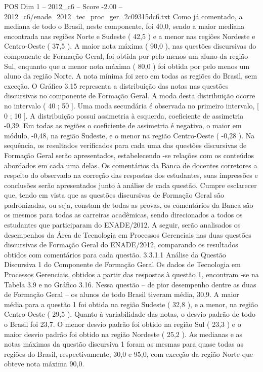 \begin{textsample}{POS Dim 1 – 2012\_c6 – Score -2.00 – 2012\_c6/enade\_2012\_tec\_proc\_ger\_2c09315dc6.txt}
Como já comentado, a mediana de todo o Brasil, neste componente, foi 40,0, sendo a maior mediana encontrada nas regiões Norte e Sudeste ( 42,5 ) e a menor nas regiões Nordeste e Centro-Oeste ( 37,5 ).
A maior nota máxima ( 90,0 ), nas questões discursivas do componente de Formação Geral, foi obtida por pelo menos um aluno da região Sul, enquanto que a menor nota máxima ( 80,0 ) foi obtida por pelo menos um aluno da região Norte.
A nota mínima foi zero em todas as regiões do Brasil, sem exceção.
O Gráfico 3.15 representa a distribuição das notas nas questões discursivas no componente de Formação Geral.
A moda desta distribuição ocorre no intervalo ( 40 ; 50 ].
Uma moda secundária é observada no primeiro intervalo, [ 0 ; 10 ].
A distribuição possui assimetria à esquerda, coeficiente de assimetria -0,39.
Em todas as regiões o coeficiente de assimetria é negativo, o maior em módulo, -0,48, na região Sudeste, e o menor na região Centro-Oeste ( -0,28 ).
Na sequência, os resultados verificados para cada uma das questões discursivas de Formação Geral serão apresentados, estabelecendo -se relações com os conteúdos abordados em cada uma delas.
Os comentários da Banca de docentes corretores a respeito do observado na correção das respostas dos estudantes, suas impressões e conclusões serão apresentados junto à análise de cada questão.
Cumpre esclarecer que, tendo em vista que as questões discursivas de Formação Geral são padronizadas, ou seja, constam de todas as provas, os comentários da Banca são os mesmos para todas as carreiras acadêmicas, sendo direcionados a todos os estudantes que participaram do ENADE/2012.
A seguir, serão analisados os desempenhos da Área de Tecnologia em Processos Gerenciais nas duas questões discursivas de Formação Geral do ENADE/2012, comparando os resultados obtidos com comentários para cada questão. 3.3.1.1 Análise da Questão Discursiva 1 do Componente de Formação Geral Os dados de Tecnologia em Processos Gerenciais, obtidos a partir das respostas à questão 1, encontram -se na Tabela 3.9 e no Gráfico 3.16.
Nessa questão – de pior desempenho dentre as duas de Formação Geral – os alunos de todo Brasil tiveram média, 30,9.
A maior média para a questão 1 foi obtida na região Sudeste ( 32,8 ), e a menor, na região Centro-Oeste ( 29,5 ).
Quanto à variabilidade das notas, o desvio padrão de todo o Brasil foi 23,7.
O menor desvio padrão foi obtido na região Sul ( 23,3 ) e o maior desvio padrão foi obtido na região Nordeste ( 25,2 ).
As medianas e as notas máximas da questão discursiva 1 foram as mesmas para quase todas as regiões do Brasil, respectivamente, 30,0 e 95,0, com exceção da região Norte que obteve nota máxima 90,0.

\end{textsample}
